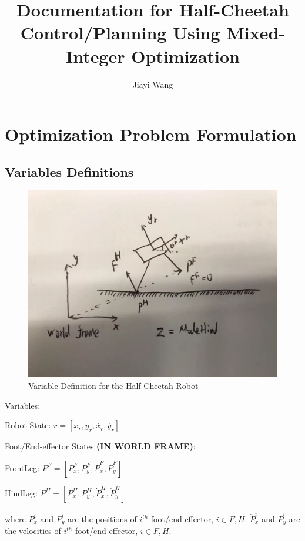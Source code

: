 \documentclass[a4paper,10pt]{article}
\title{Documentation for Half-Cheetah Control/Planning Using Mixed-Integer Optimization}
\author{Jiayi Wang}
\begin{document}
\maketitle

\section{Optimization Problem Formulation}

\subsection{Variables Definitions}

\begin{figure}[h!]
	\centering
	\includegraphics[scale = 0.3]{variable_definitions}
	\caption{Variable Definition for the Half Cheetah Robot}
	\label{fig:variable_definitions}
\end{figure}

Variables:
\vspace{2mm}

Robot State: $r = [x_r,y_r,\dot{x_r},\dot{y_r}]$
\vspace{2mm}

Foot/End-effector States \textbf{(IN WORLD FRAME)}: 

FrontLeg: $P^F=[P^F_x,P^F_y,\dot{P}^F_x,\dot{P}^F_y]$

HindLeg: $P^H=[P^H_x,P^H_y,\dot{P}^H_x,\dot{P}^H_y]$
\vspace{2mm}

where $P^i_x$ and $P^i_y$ are the positions of $i^{th}$ foot/end-effector, $i \in F, H$.
$\dot{P}^i_x$ and $\dot{P}^i_y$ are the velocities of $i^{th}$ foot/end-effector, $i \in F, H$.
\end{document}
